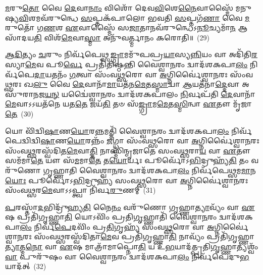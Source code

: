\-\ul{𑌮}\-𑌰𑍁\-\ul{𑌤𑍋} 𑌵𑍈 \ul{𑌦𑍇}\-𑌵𑌾\-\ul{𑌨𑌾𑌂} 𑌵𑌿𑌶𑍋᳴ 𑌦𑍇𑌵\-\ul{𑌵𑌿}\-𑌶𑍇\-\ul{𑌨𑍈}\-𑌵𑌾𑌸𑍍𑌮𑍈᳴ 𑌮𑌨𑍁𑌷𑍍𑌯\-\ul{𑌵𑌿}\-𑌶𑌮𑌵᳴\-𑌰𑍁𑌨𑍍𑌧𑍇 \ul{𑌸}\-𑌪𑍍𑌤𑌕᳴𑌪𑌾𑌲𑍋 𑌭𑌵𑌤𑌿 \ul{𑌸}\-𑌪𑍍𑌤𑌗᳴\-\ul{𑌣𑌾} 𑌵𑍈 \ul{𑌮}\-𑌰𑍁𑌤𑍋᳴ 𑌗\-\ul{𑌣}\-𑌶 \ul{𑌏}\-𑌵𑌾𑌸𑍍𑌮𑍈᳴ 𑌸\-\ul{𑌜𑌾}\-𑌤𑌾𑌨𑌵᳴\-𑌰𑍁𑌨𑍍𑌧𑍇\-𑌽\-\ul{𑌨𑍂}\-𑌚𑍍𑌯𑌮𑌾᳴\-\ul{𑌨} 𑌆𑌸𑌾᳴𑌦𑌯\-\ul{𑌤𑌿} 𑌵𑌿𑌶᳴\-\ul{𑌮𑍇}\-𑌵𑌾\-\ul{𑌸𑍍𑌮𑌾} 𑌅𑌨𑍁᳴𑌵𑌰𑍍𑌤𑍍𑌮𑌾𑌨𑌂 𑌕𑌰𑍋𑌤𑌿॥~(29)

{\anuvakamend[{\-\ul{𑌪𑍍𑌰}\-𑌜𑌾𑌕𑌾᳴𑌮𑌃 𑌸𑌂𑌵\-\ul{𑌥𑍍𑌸}\-𑌰𑌃 \ul{𑌪𑍁}\-𑌨𑌾\-\ul{𑌤𑍍𑌯𑍇}\-𑌵𑍈𑌨𑌂᳴ \ul{𑌪𑍂}\-𑌤𑌃 𑌸𑌮᳴𑌷𑍍𑌟𑍍𑌯𑍈 \ul{𑌤𑌾}\-𑌦𑍃𑌙𑍍𑌮𑌾᳴\-\ul{𑌰𑍁}\-𑌤𑍋 𑌭᳴\-\ul{𑌵}\-𑌤𑍍𑌯𑍇\-\ul{𑌕𑌾}\-𑌨𑍍𑌨\-\ul{𑌤𑍍𑌰𑌿}\-\-\ul{𑍞}\-𑌶𑌚𑍍𑌚᳴}]}%

\-\ul{𑌆}\-\-\ul{𑌦𑌿}\-𑌤𑍍𑌯𑌂 \ul{𑌚}\-𑌰𑍁𑌂 𑌨𑌿𑌰𑍍𑌵᳴𑌪𑍇𑌥𑍍𑌸\-\ul{𑌙𑍍𑌗𑍍𑌰𑌾}\-𑌮𑌮𑍁᳴𑌪𑌪𑍍𑌰\-\ul{𑌯𑌾}\-𑌸𑍍𑌯\-\ul{𑌨𑍍𑌨𑌿}\-𑌯𑌂 𑌵𑌾 𑌅𑌦𑌿᳴𑌤𑌿\-\ul{𑌰}\-𑌸𑍍𑌯𑌾\-\ul{𑌮𑍇}\-𑌵 𑌪𑍂\-\ul{𑌰𑍍𑌵𑍇} 𑌪𑍍𑌰𑌤𑌿᳴𑌤𑌿𑌷𑍍𑌠𑌨𑍍𑌤𑌿 𑌵𑍈𑌶𑍍𑌵𑌾\-\ul{𑌨}\-𑌰𑌂 𑌦𑍍𑌵𑌾𑌦᳴𑌶\-𑌕𑌪𑌾\-\ul{𑌲𑌂} 𑌨𑌿𑌰𑍍𑌵᳴𑌪𑍇\-\ul{𑌦𑌾}\-𑌯𑌤𑌨𑌂᳴ \ul{𑌗}\-𑌤𑍍𑌵𑌾 𑌸𑌂᳴𑌵\-\ul{𑌥𑍍𑌸}\-𑌰𑍋 𑌵𑌾 \ul{𑌅}\-𑌗𑍍𑌨𑌿𑌰𑍍𑌵𑍈॑𑌶𑍍𑌵𑌾\-\ul{𑌨}\-𑌰𑌃 𑌸𑌂᳴𑌵\-\ul{𑌥𑍍𑌸}\-𑌰𑌃 𑌖\-\ul{𑌲𑍁} 𑌵𑍈 \ul{𑌦𑍇}\-𑌵𑌾𑌨𑌾᳴\-\ul{𑌮𑌾}\-𑌯𑌤᳴𑌨\-\ul{𑌮𑍇}\-𑌤\-\ul{𑌸𑍍𑌮𑌾}\-𑌦𑍍𑌵𑌾 \ul{𑌆}\-𑌯𑌤᳴𑌨𑌾\-\ul{𑌦𑍍𑌦𑍇}\-𑌵𑌾 𑌅𑌸𑍁᳴𑌰𑌾𑌨𑌜\-\ul{𑌯}\-\-\ul{𑌨𑍍} 𑌯𑌦𑍍𑌵𑍈॑𑌶𑍍𑌵𑌾\-\ul{𑌨}\-𑌰𑌂 𑌦𑍍𑌵𑌾𑌦᳴𑌶\-𑌕𑌪𑌾𑌲𑌂 \ul{𑌨𑌿}\-𑌰𑍍𑌵𑌪᳴𑌤𑌿 \ul{𑌦𑍇}\-𑌵𑌾𑌨𑌾᳴\-\-\ul{𑌮𑍇}\-𑌵𑌾\-𑌽𑌽\-𑌯𑌤᳴𑌨𑍇 𑌯𑌤\-\ul{𑌤𑍇} 𑌜𑌯᳴\-\ul{𑌤𑌿} 𑌤𑍞 𑌸᳴\-\ul{𑌙𑍍𑌗𑍍𑌰𑌾}\-𑌮\-\ul{𑌮𑍇}\-𑌤\-\ul{𑌸𑍍𑌮𑌿}\-𑌨𑍍𑌵𑌾 \ul{𑌏}\-𑌤𑍗 𑌮𑍃᳴𑌜𑌾\-\ul{𑌤𑍇}\-~(30)

𑌯𑍋 𑌵𑌿᳴𑌦𑍍𑌵𑌿\-\ul{𑌷𑌾}\-𑌣\-\ul{𑌯𑍋}\-𑌰\-\ul{𑌨𑍍𑌨}\-𑌮𑌤𑍍𑌤𑌿᳴ 𑌵𑍈𑌶𑍍𑌵𑌾\-\ul{𑌨}\-𑌰𑌂 𑌦𑍍𑌵𑌾𑌦᳴𑌶\-𑌕𑌪𑌾\-\ul{𑌲𑌂} 𑌨𑌿𑌰𑍍𑌵᳴𑌪𑍇𑌦𑍍𑌵𑌿𑌦𑍍𑌵𑌿\-\ul{𑌷𑌾}\-𑌣\-\ul{𑌯𑍋}\-𑌰𑌨𑍍𑌨𑌂᳴ \ul{𑌜}\-𑌗𑍍𑌧𑍍𑌵𑌾 𑌸𑌂᳴𑌵\-\ul{𑌥𑍍𑌸}\-𑌰𑍋 𑌵𑌾 \ul{𑌅}\-𑌗𑍍𑌨𑌿𑌰𑍍𑌵𑍈॑𑌶𑍍𑌵𑌾\-\ul{𑌨}\-𑌰𑌃 𑌸𑌂᳴𑌵\-\ul{𑌥𑍍𑌸}\-𑌰𑌸𑍍𑌵᳴𑌦𑌿𑌤\-\ul{𑌮𑍇}\-𑌵𑌾\-\ul{𑌤𑍍𑌤𑌿} 𑌨𑌾𑌸𑍍𑌮𑌿᳴𑌨𑍍𑌮𑍃𑌜𑌾𑌤𑍇 𑌸𑌂𑌵\-\ul{𑌥𑍍𑌸}\-𑌰𑌾\-\ul{𑌯} 𑌵𑌾 \ul{𑌏}\-𑌤𑍗 𑌸𑌮᳴𑌮𑌾\-\ul{𑌤𑍇} 𑌯𑍗 𑌸᳴\-\ul{𑌮}\-𑌮𑌾\-\ul{𑌤𑍇} 𑌤\-\ul{𑌯𑍋}\-𑌰𑍍𑌯𑌃 𑌪𑍂𑌰𑍍𑌵𑍋᳴\-𑌽\-\ul{𑌭𑌿}\-𑌦𑍍𑌰𑍁𑌹𑍍𑌯᳴\-\ul{𑌤𑌿} 𑌤𑌂 𑌵𑌰𑍁᳴𑌣𑍋 𑌗𑍃𑌹𑍍𑌣𑌾𑌤𑌿 𑌵𑍈𑌶𑍍𑌵𑌾\-\ul{𑌨}\-𑌰𑌂 𑌦𑍍𑌵𑌾𑌦᳴𑌶\-𑌕𑌪𑌾\-\ul{𑌲𑌂} 𑌨𑌿𑌰𑍍𑌵᳴𑌪𑍇𑌥𑍍𑌸𑌮\-\ul{𑌮𑌾}\-𑌨\-\ul{𑌯𑍋𑌃} 𑌪𑍂𑌰𑍍𑌵𑍋᳴\-𑌽\-\ul{𑌭𑌿}\-𑌦𑍍𑌰𑍁𑌹𑍍𑌯᳴ 𑌸𑌂𑌵\-\ul{𑌥𑍍𑌸}\-𑌰𑍋 𑌵𑌾 \ul{𑌅}\-𑌗𑍍𑌨𑌿𑌰𑍍𑌵𑍈॑𑌶𑍍𑌵𑌾\-\ul{𑌨}\-𑌰𑌃 𑌸𑌂᳴𑌵\-\ul{𑌥𑍍𑌸}\-𑌰\-\ul{𑌮𑍇}\-𑌵𑌾𑌽𑌽𑌪𑍍𑌤𑍍𑌵𑌾 𑌨𑌿᳴𑌰𑍍𑌵\-\ul{𑌰𑍁}\-𑌣𑌮𑍍~(31)

\-\ul{𑌪}\-𑌰𑌸𑍍𑌤𑌾᳴\-\ul{𑌦}\-𑌭𑌿𑌦𑍍𑌰𑍁᳴𑌹𑍍𑌯\-\ul{𑌤𑌿} 𑌨𑍈\-\ul{𑌨𑌂} 𑌵𑌰𑍁᳴𑌣𑍋 𑌗𑍃𑌹𑍍𑌣𑌾\-\ul{𑌤𑍍𑌯𑌾}\-𑌵𑍍𑌯𑌂᳴ 𑌵𑌾 \ul{𑌏}\-𑌷 𑌪𑍍𑌰𑌤𑌿᳴𑌗𑍃𑌹𑍍𑌣𑌾\-\ul{𑌤𑌿} 𑌯𑍋\-𑌽𑌵𑌿𑌂᳴ 𑌪𑍍𑌰𑌤𑌿\-\ul{𑌗𑍃}\-𑌹𑍍𑌣𑌾𑌤𑌿᳴ 𑌵𑍈𑌶𑍍𑌵𑌾\-\ul{𑌨}\-𑌰𑌂 𑌦𑍍𑌵𑌾𑌦᳴𑌶\-𑌕𑌪𑌾\-\ul{𑌲𑌂} 𑌨𑌿𑌰𑍍𑌵᳴\-\ul{𑌪𑍇}\-𑌦𑌵𑌿𑌂᳴ 𑌪𑍍𑌰\-\ul{𑌤𑌿}\-𑌗𑍃𑌹𑍍𑌯᳴ 𑌸𑌂𑌵\-\ul{𑌥𑍍𑌸}\-𑌰𑍋 𑌵𑌾 \ul{𑌅}\-𑌗𑍍𑌨𑌿𑌰𑍍𑌵𑍈॑𑌶𑍍𑌵𑌾\-\ul{𑌨}\-𑌰𑌃 𑌸𑌂᳴𑌵\-\ul{𑌥𑍍𑌸}\-𑌰𑌸𑍍𑌵᳴𑌦𑌿𑌤𑌾\-\ul{𑌮𑍇}\-𑌵 𑌪𑍍𑌰𑌤𑌿᳴𑌗𑍃𑌹𑍍𑌣𑌾\-\ul{𑌤𑌿} 𑌨𑌾𑌵𑍍𑌯𑌂᳴ 𑌪𑍍𑌰𑌤𑌿᳴\-𑌗𑍃𑌹𑍍𑌣𑌾\-\ul{𑌤𑍍𑌯𑌾}\-𑌤𑍍𑌮\-\ul{𑌨𑍋} 𑌵𑌾 \ul{𑌏}\-𑌷 𑌮𑌾𑌤𑍍𑌰𑌾᳴𑌮𑌾𑌪𑍍𑌨𑍋\-\ul{𑌤𑌿} 𑌯 𑌉᳴\-\ul{𑌭}\-𑌯𑌾𑌦᳴𑌤𑍍𑌪𑍍𑌰𑌤𑌿\-\ul{𑌗𑍃}\-𑌹𑍍𑌣𑌾𑌤𑍍𑌯𑌶𑍍𑌵𑌂᳴ \ul{𑌵𑌾} 𑌪𑍁𑌰𑍁᳴𑌷𑌂 𑌵𑌾 𑌵𑍈𑌶𑍍𑌵𑌾\-\ul{𑌨}\-𑌰𑌂 𑌦𑍍𑌵𑌾𑌦᳴𑌶\-𑌕𑌪𑌾\-\ul{𑌲𑌂} 𑌨𑌿𑌰𑍍𑌵᳴𑌪𑍇𑌦𑍁\-\ul{𑌭}\-𑌯𑌾𑌦᳴𑌤𑍍~(32)

